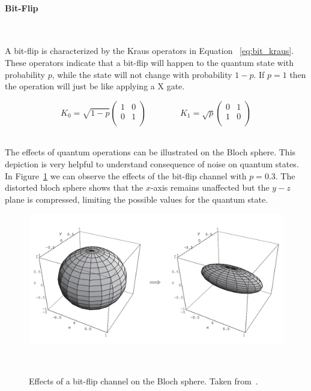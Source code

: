 \paragraph{Bit-Flip} \

A bit-flip is characterized by the Kraus operators in Equation
~\ref{eq:bit_kraus}. These operators indicate that a bit-flip
will happen to the quantum state with probability \(p\), while
the state will not change with probability \(1-p\). If \(p=1\)
then the operation will just be like applying a X gate. \

\begin{equation}\label{eq:bit_kraus}
  K_0 = \sqrt{1-p} \begin{pmatrix}
          1 & 0 \\
          0 & 1 \\
        \end{pmatrix} \qquad \qquad
  K_1 = \sqrt{p} \begin{pmatrix}
          0 & 1 \\
          1 & 0 \\
        \end{pmatrix}
\end{equation} \

The effects of quantum operations can be illustrated on the Bloch sphere.
This depiction is very helpful to understand consequence of noise on
quantum states. In Figure~\ref{fig:bit_flip} we can observe the effects
of the bit-flip channel with \(p=0.3\). The distorted bloch sphere shows
that the \(x\)-axis remains unaffected but the \(y-z\) plane is compressed,
limiting the possible values for the quantum state. \

\begin{figure}[h!]
  \includegraphics[scale=0.39]{figures/bit_flip.png}
  \centering
  \caption{Effects of a bit-flip channel on the Bloch sphere. Taken from~\cite{nielsen_quantum_2010}.}
~\label{fig:bit_flip}
\end{figure} \

